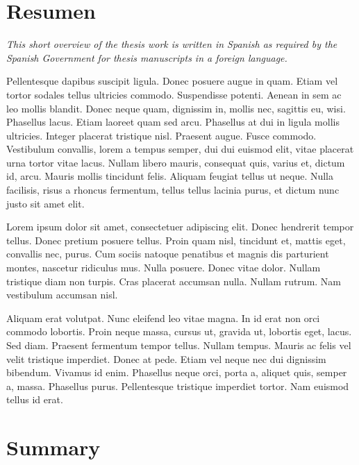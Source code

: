 \chapter*{Resumen}

\textit{This short overview of the thesis work is written in Spanish as required by the Spanish Government for thesis manuscripts in a foreign language.}

Pellentesque dapibus suscipit ligula.  Donec posuere augue in quam.
Etiam vel tortor sodales tellus ultricies commodo.  Suspendisse
potenti.  Aenean in sem ac leo mollis blandit.  Donec neque quam,
dignissim in, mollis nec, sagittis eu, wisi.  Phasellus lacus.  Etiam
laoreet quam sed arcu.  Phasellus at dui in ligula mollis ultricies.
Integer placerat tristique nisl.  Praesent augue.  Fusce commodo.
Vestibulum convallis, lorem a tempus semper, dui dui euismod elit,
vitae placerat urna tortor vitae lacus.  Nullam libero mauris,
consequat quis, varius et, dictum id, arcu.  Mauris mollis tincidunt
felis.  Aliquam feugiat tellus ut neque.  Nulla facilisis, risus a
rhoncus fermentum, tellus tellus lacinia purus, et dictum nunc justo
sit amet elit.

Lorem ipsum dolor sit amet, consectetuer adipiscing elit.  Donec
hendrerit tempor tellus.  Donec pretium posuere tellus.  Proin quam
nisl, tincidunt et, mattis eget, convallis nec, purus.  Cum sociis
natoque penatibus et magnis dis parturient montes, nascetur ridiculus
mus.  Nulla posuere.  Donec vitae dolor.  Nullam tristique diam non
turpis.  Cras placerat accumsan nulla.  Nullam rutrum.  Nam vestibulum
accumsan nisl.

Aliquam erat volutpat.  Nunc eleifend leo vitae magna.  In id erat non
orci commodo lobortis.  Proin neque massa, cursus ut, gravida ut,
lobortis eget, lacus.  Sed diam.  Praesent fermentum tempor tellus.
Nullam tempus.  Mauris ac felis vel velit tristique imperdiet.  Donec
at pede.  Etiam vel neque nec dui dignissim bibendum.  Vivamus id
enim.  Phasellus neque orci, porta a, aliquet quis, semper a, massa.
Phasellus purus.  Pellentesque tristique imperdiet tortor.  Nam
euismod tellus id erat.


\chapter*{Summary}

